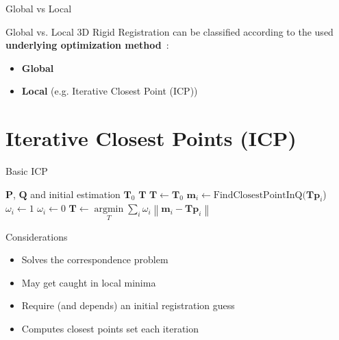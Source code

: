 \documentclass[aspectratio=1610]{beamer}
\newcommand*\pro{%
  \item[\color{ProGreen}\scalebox{1.5}{\faThumbsOUp}]}
\newcommand*\con{%
  \item[\color{ConRed}\scalebox{1.5}{\faThumbsODown}]}
\renewcommand*{\cite}{\parencite}
\newcommand{\norm}[1]{\left\lVert#1\right\rVert}
\DeclareMathOperator*{\argmin}{argmin}
\begin{document}


\begin{frame}{Global vs Local}
\begin{alertblock}{Global vs. Local}
3D Rigid Registration can be classified according to the used \textbf{underlying optimization method}~\cite{rusu2009fast}:
\begin{itemize}
\item \textbf{Global}%
\item \textbf{Local} (e.g. Iterative Closest Point (ICP))
\end{itemize}
\end{alertblock}
\end{frame}

\section{Iterative Closest Points (ICP)} %
\begin{frame}[shrink=10]{Basic ICP}
\begin{algorithm}[H]
\begin{algorithmic}[1]
\REQUIRE $\bm{P}$, $\bm{Q}$ and initial estimation $\bm{T}_0$
\ENSURE $\bm{T}$
\STATE $\bm{T}\gets\bm{T}_0$
    \STATE $\bm{m}_i\gets\text{FindClosestPointInQ}(\bm{T}\bm{p}_i$)
    \IF{$\norm{\bm{m}_i-\bm{T}\bm{p_i}}\leq d_{\text{max}}$}
      \STATE $\omega_i\gets 1$
    \ELSE
      \STATE $\omega_i\gets 0$
    \ENDIF
  \ENDFOR
  \STATE $\bm{T}\gets\argmin\limits_T \sum\limits_i \omega_i \norm{\bm{m}_i-\bm{T}\bm{p}_i}$
\ENDWHILE
\end{algorithmic}
\caption{Iterative Closest Points (ICP)}
\label{alg:ICP}
\end{algorithm}
\end{frame}

\begin{frame}{Considerations}
\begin{itemize}[wide, labelsep=2em]
  \pro Solves the correspondence problem
  \con May get caught in local minima
  \con Require (and depends) an initial registration guess
  \con Computes closest points set each iteration
\end{itemize}
\end{frame}
\end{document}

